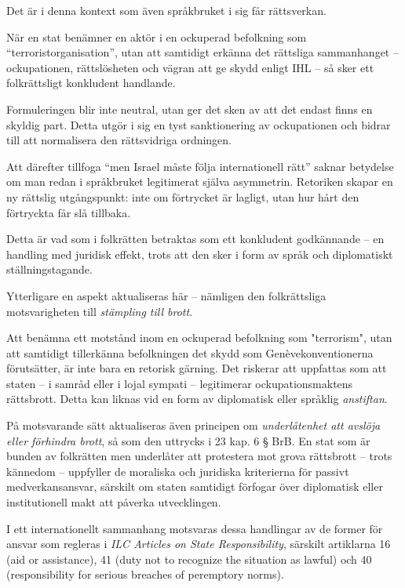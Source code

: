 Det är i denna kontext som även språkbruket i sig får rättsverkan.

När en stat benämner en aktör i en ockuperad befolkning som “terroristorganisation”, utan att samtidigt erkänna det rättsliga sammanhanget – ockupationen, rättslösheten och vägran att ge skydd enligt IHL – så sker ett folkrättsligt konkludent handlande.

Formuleringen blir inte neutral, utan ger det sken av att det endast finns en skyldig part. Detta utgör i sig en tyst sanktionering av ockupationen och bidrar till att normalisera den rättsvidriga ordningen.

Att därefter tillfoga “men Israel måste följa internationell rätt” saknar betydelse om man redan i språkbruket legitimerat själva asymmetrin. Retoriken skapar en ny rättslig utgångspunkt: inte om förtrycket är lagligt, utan hur hårt den förtryckta får slå tillbaka.

Detta är vad som i folkrätten betraktas som ett konkludent godkännande – en handling med juridisk effekt, trots att den sker i form av språk och diplomatiskt ställningstagande.

Ytterligare en aspekt aktualiseras här – nämligen den folkrättsliga motsvarigheten till \textit{stämpling till brott}.

Att benämna ett motstånd inom en ockuperad befolkning som "terrorism", utan att samtidigt tillerkänna befolkningen det skydd som Genèvekonventionerna förutsätter, är inte bara en retorisk gärning. Det riskerar att uppfattas som att staten – i samråd eller i lojal sympati – legitimerar ockupationsmaktens rättsbrott. Detta kan liknas vid en form av diplomatisk eller språklig \textit{anstiftan}.

På motsvarande sätt aktualiseras även principen om \textit{underlåtenhet att avslöja eller förhindra brott}, så som den uttrycks i 23 kap. 6 § BrB. En stat som är bunden av folkrätten men underlåter att protestera mot grova rättsbrott – trots kännedom – uppfyller de moraliska och juridiska kriterierna för passivt medverkansansvar, särskilt om staten samtidigt förfogar över diplomatisk eller institutionell makt att påverka utvecklingen.

I ett internationellt sammanhang motsvaras dessa handlingar av de former för ansvar som regleras i \textit{ILC Articles on State Responsibility}, särskilt artiklarna 16 (aid or assistance), 41 (duty not to recognize the situation as lawful) och 40 (responsibility for serious breaches of peremptory norms).

